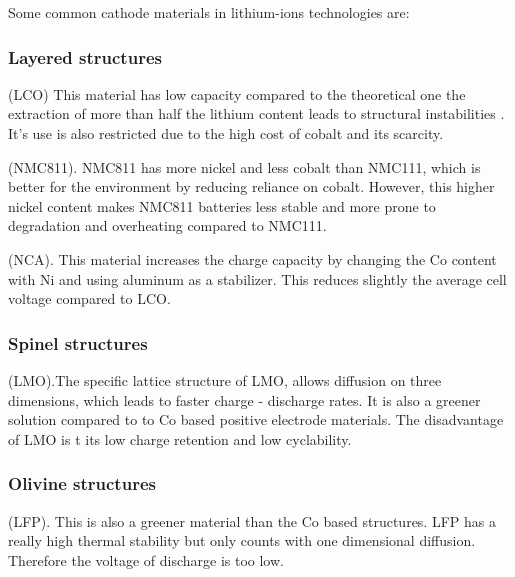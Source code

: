 \documentclass{article}
\begin{document}
Some common cathode materials in lithium-ions technologies are:
\begin{description}
 \subsubsection{Layered structures}
  \item[$\text{LiCoO}_{2}$]  (LCO) This material has low capacity compared to the 
  theoretical one the extraction of more than half the lithium content leads to structural instabilities
  . It's use is also restricted due to the high cost of cobalt and its scarcity. 
  \item[$ \text{Li(Ni}_{0.8}\text{Co}_{0.1}\text{Mn}_{0.1}\text{)O}_{2} $]  (NMC811).
  NMC811 has more nickel and less cobalt than NMC111, which is better for the environment by reducing reliance on cobalt. However, this higher nickel content makes NMC811 batteries less stable and more prone to degradation and overheating compared to NMC111.
  

  \item[$\text{LiNi}_{0.8}\text{Co}_{0.15}\text{Al}_{0.05}\text{O}_{2}$] (NCA).
  This material increases the charge capacity by changing the Co content with Ni and using aluminum as 
  a stabilizer. This reduces slightly the average cell voltage
  compared to LCO.
\end{description}

\begin{description}
 \subsubsection{Spinel structures}
  \item[$\text{LiMn}_{2}\text{O}_{4}$](LMO).The specific lattice structure
  of LMO, allows diffusion on three dimensions, which leads to faster charge
  - discharge rates. It is also a greener solution compared to to 
  Co based positive electrode materials. The disadvantage of LMO is t
its low charge retention and low cyclability.
\end{description}

\begin{description}
  \subsubsection{Olivine structures}
  \item[$\text{LiFePO}_{4}$](LFP). This is also a greener material than the 
  Co based structures. LFP has a really high thermal stability but only counts
  with one dimensional diffusion. Therefore the voltage of discharge
  is too low.
\end{description}
\end{document}
